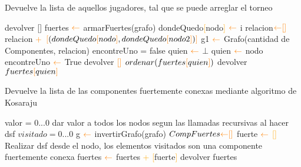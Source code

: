 \begin{algorithm}
\caption{Devuelve la lista de aquellos jugadores, tal que se puede arreglar el torneo}
\begin{algorithmic}[1]
	\STATE devolver []
\ENDIF
\STATE fuertes $\textcolor{orange}{\leftarrow}$ armarFuertes(grafo)
			\STATE dondeQuedo\textcolor{orange}{[}nodo\textcolor{orange}{]} $\textcolor{orange}{\leftarrow}$ i
	\ENDFOR
\ENDFOR
\STATE relacion$\textcolor{orange}{\leftarrow}\textcolor{orange}{[} \textcolor{orange}{]}$
				\STATE relacion $\textcolor{orange}{+}$ $\textcolor{orange}{[}(dondeQuedo\textcolor{orange}{[}nodo\textcolor{orange}{]},dondeQuedo\textcolor{orange}{[}nodo2\textcolor{orange}{]})\textcolor{orange}{]}$
			\ENDIF
	\ENDFOR
\ENDFOR
\STATE g1 $\textcolor{orange}{\leftarrow}$ Grafo(cantidad de Componentes, relacion)
\STATE encontreUno = false
\STATE quien $\textcolor{orange}{\leftarrow}$ $\bot$
		\STATE quien $\textcolor{orange}{\leftarrow}$ nodo
		\STATE encontreUno $\textcolor{orange}{\leftarrow}$ True
		\STATE devolver $\textcolor{orange}{[}\textcolor{orange}{]}$
	\ENDIF
\ENDFOR
\STATE $ordenar(fuertes\textcolor{orange}{[}quien\textcolor{orange}{]})$ 
\STATE devolver $fuertes\textcolor{orange}{[}quien\textcolor{orange}{]}$	
\end{algorithmic}
\end{algorithm}

\begin{algorithm}
\caption{Devuelve la lista de las componentes fuertemente conexas mediante algoritmo de Kosaraju}
\begin{algorithmic}[1]
\STATE valor = {0...0}
\STATE dar valor a todos los nodos segun las llamadas recursivas al hacer dsf
\STATE $visitado = {0...0}$
\STATE g $\textcolor{orange}{\leftarrow}$ invertirGrafo(grafo)
\STATE $CompFuertes \textcolor{orange}{\leftarrow} \textcolor{orange}{[}\textcolor{orange}{]}$
		\STATE fuerte $\textcolor{orange}{\leftarrow}$ \textcolor{orange}{[}\textcolor{orange}{]}
		\STATE Realizar dsf desde el nodo, los elementos visitados son una componente fuertemente conexa
		\STATE fuertes $\textcolor{orange}{\leftarrow}$ fuertes \textcolor{orange}{+} \textcolor{orange}{[}fuerte\textcolor{orange}{]}
\ENDFOR
\STATE devolver fuertes
\end{algorithmic}
\end{algorithm}


